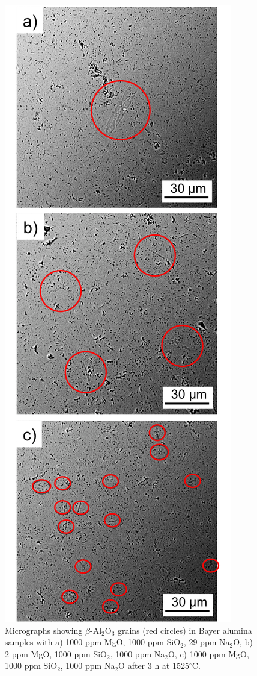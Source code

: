 \newpage
\begin{figure}[H]
	\centering
	\includegraphics{Chapter-5/Figures/Figure5.png}
	\caption{Micrographs showing $\beta$-Al$_{2}$O$_{3}$ grains (red circles) in Bayer alumina samples with a) 1000 ppm MgO, 1000 ppm SiO$_{2}$, 29 ppm Na$_{2}$O, b) 2 ppm MgO, 1000 ppm SiO$_{2}$, 1000 ppm Na$_{2}$O, c) 1000 ppm MgO, 1000 ppm SiO$_{2}$, 1000 ppm Na$_{2}$O after 3 h at 1525$^{\circ}$C.}
	\label{Ch5-figure:Figure5}
\end{figure}


